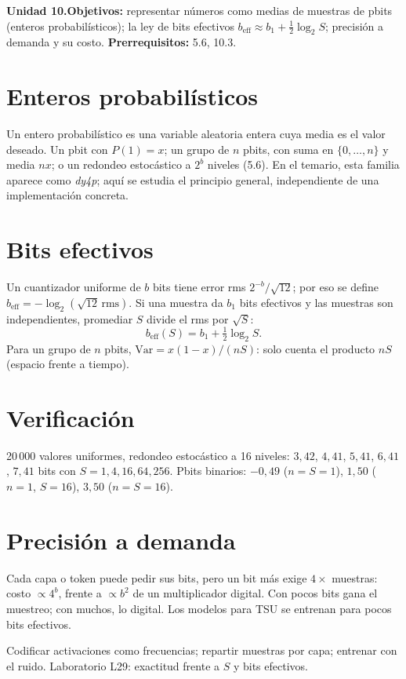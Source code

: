\documentclass[11pt,a4paper]{article}
\begin{document}

\noindent\textbf{Unidad 10.}\quad\textbf{Objetivos:} representar números como medias de muestras de pbits (enteros probabilísticos); la ley de bits efectivos
$b_{\text{eff}}\approx b_1+\tfrac12\log_2S$; precisión a demanda y su costo.
\textbf{Prerrequisitos:} 5.6, 10.3.

\section{Enteros probabilísticos}
Un entero probabilístico es una variable aleatoria entera cuya media es el valor deseado. Un pbit con $P(1)=x$; un grupo de $n$ pbits, con suma en $\{0,\dots,n\}$ y media
$nx$; o un redondeo estocástico a $2^{b}$ niveles (5.6). En el temario, esta familia aparece como \emph{dy4p}; aquí se estudia el principio general, independiente de una
implementación concreta.

\section{Bits efectivos}
Un cuantizador uniforme de $b$ bits tiene error rms $2^{-b}/\sqrt{12}$; por eso se define $b_{\text{eff}}=-\log_2(\sqrt{12}\,\mathrm{rms})$. Si una muestra da $b_1$ bits
efectivos y las muestras son independientes, promediar $S$ divide el rms por $\sqrt S$:
\[b_{\text{eff}}(S)=b_1+\tfrac12\log_2S.\]
Para un grupo de $n$ pbits, $\mathrm{Var}=x(1-x)/(nS)$: solo cuenta el producto $nS$ (espacio frente a tiempo).

\section{Verificación \evS}
20\,000 valores uniformes, redondeo estocástico a 16 niveles: $3{,}42$, $4{,}41$, $5{,}41$, $6{,}41$, $7{,}41$ bits con $S=1,4,16,64,256$. Pbits binarios:
$-0{,}49$ ($n=S=1$), $1{,}50$ ($n=1$, $S=16$), $3{,}50$ ($n=S=16$).

\section{Precisión a demanda}
Cada capa o token puede pedir sus bits, pero un bit más exige $4\times$ muestras: costo $\propto4^b$, frente a $\propto b^2$ de un multiplicador digital. Con pocos bits gana
el muestreo; con muchos, lo digital. Los modelos para TSU se entrenan para pocos bits efectivos.

\begin{aplicacion}
Codificar activaciones como frecuencias; repartir muestras por capa; entrenar con el ruido. Laboratorio L29: exactitud frente a $S$ y bits efectivos.
\end{aplicacion}
\end{document}
